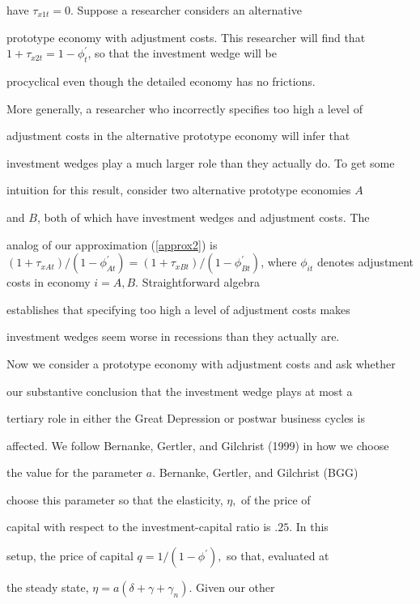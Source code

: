 \documentclass[fleqn,leqno,11pt]{article}
\begin{document}
have $\tau _{x1t}=0.$ Suppose a researcher considers an alternative

prototype economy with adjustment costs. This researcher will find that $%

1+\tau _{x2t}=1-\phi _{t}^{\prime }$, so that the investment wedge will be

procyclical even though the detailed economy has no frictions.



More generally, a researcher who incorrectly specifies too high a level of

adjustment costs in the alternative prototype economy will infer that

investment wedges play a much larger role than they actually do. To get some

intuition for this result, consider two alternative prototype economies $A$

and $B$, both of which have investment wedges and adjustment costs. The

analog of our approximation (\ref{approx2}) is $(1+\tau _{xAt})/(1-\phi

_{At}^{\prime })=(1+\tau _{xBt})/(1-\phi _{Bt}^{\prime })$, where $\phi

_{it} $ denotes adjustment costs in economy $i=A,B.$ Straightforward algebra

establishes that specifying too high a level of adjustment costs makes

investment wedges seem worse in recessions than they actually are.



Now we consider a prototype economy with adjustment costs and ask whether

our substantive conclusion that the investment wedge plays at most a

tertiary role in either the Great Depression or postwar business cycles is

affected. We follow Bernanke, Gertler, and Gilchrist (1999) in how we choose

the value for the parameter $a.$ Bernanke, Gertler, and Gilchrist (BGG)

choose this parameter so that the elasticity, $\eta ,$ of the price of

capital with respect to the investment-capital ratio is $.25.$ In this

setup, the price of capital $q=1/(1-\phi ^{\prime }),$ so that, evaluated at

the steady state, $\eta =a(\delta +\gamma +\gamma _{n}).$ Given our other
\end{document}
